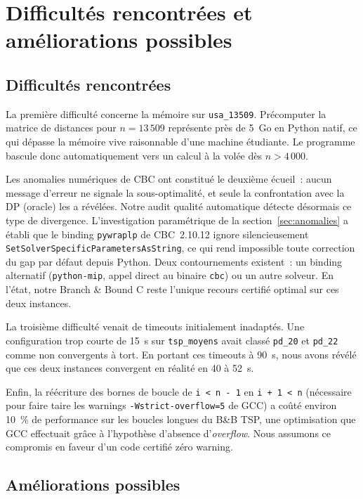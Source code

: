 \documentclass[11pt,a4paper]{article}
\begin{document}
\section{Difficultés rencontrées et améliorations possibles}
\label{sec:discu}

\subsection{Difficultés rencontrées}

La première difficulté concerne la mémoire sur \texttt{usa\_13509}. Précomputer la matrice de distances pour $n = 13\,509$ représente près de 5~Go en Python natif, ce qui dépasse la mémoire vive raisonnable d'une machine étudiante. Le programme bascule donc automatiquement vers un calcul à la volée dès $n > 4\,000$.

Les anomalies numériques de CBC ont constitué le deuxième écueil~: aucun message d'erreur ne signale la sous-optimalité, et seule la confrontation avec la DP (oracle) les a révélées. Notre audit qualité automatique détecte désormais ce type de divergence. L'investigation paramétrique de la section~\ref{sec:anomalies} a établi que le binding \texttt{pywraplp} de CBC~2.10.12 ignore silencieusement \texttt{SetSolverSpecificParametersAsString}, ce qui rend impossible toute correction du gap par défaut depuis Python. Deux contournements existent~: un binding alternatif (\texttt{python-mip}, appel direct au binaire \texttt{cbc}) ou un autre solveur. En l'état, notre Branch \& Bound C reste l'unique recours certifié optimal sur ces deux instances.

La troisième difficulté venait de timeouts initialement inadaptés. Une configuration trop courte de 15~s sur \texttt{tsp\_moyens} avait classé \texttt{pd\_20} et \texttt{pd\_22} comme non convergents à tort. En portant ces timeouts à 90~s, nous avons révélé que ces deux instances convergent en réalité en 40 à 52~s.

Enfin, la réécriture des bornes de boucle de \verb|i < n - 1| en \verb|i + 1 < n| (nécessaire pour faire taire les warnings \verb|-Wstrict-overflow=5| de GCC) a coûté environ 10~\% de performance sur les boucles longues du B\&B TSP, une optimisation que GCC effectuait grâce à l'hypothèse d'absence d'\textit{overflow}. Nous assumons ce compromis en faveur d'un code certifié zéro warning.

\subsection{Améliorations possibles}
\end{document}
